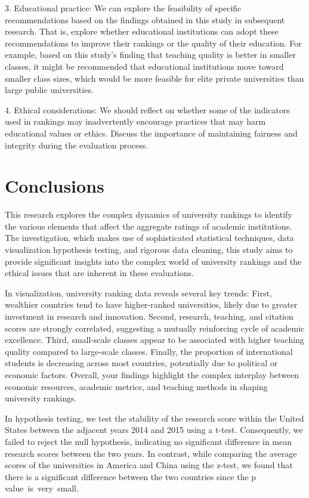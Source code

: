 \documentclass[a4paper]{article}
\begin{document}
3. Educational practice: We can explore the feasibility of specific recommendations based on the findings obtained in this study in subsequent research. That is, explore whether educational institutions can adopt these recommendations to improve their rankings or the quality of their education. For example, based on this study's finding that teaching quality is better in smaller classes, it might be recommended that educational institutions move toward smaller class sizes, which would be more feasible for elite private universities than large public universities.

4. Ethical considerations: We should reflect on whether some of the indicators used in rankings may inadvertently encourage practices that may harm educational values or ethics. Discuss the importance of maintaining fairness and integrity during the evaluation process.

\section*{Conclusions}
This research explores the complex dynamics of university rankings to identify the various elements that affect the aggregate ratings of academic institutions. The investigation, which makes use of sophisticated statistical techniques, data visualization hypothesis testing, and rigorous data cleaning, this study aims to provide significant insights into the complex world of university rankings and the ethical issues that are inherent in these evaluations.

In visualization, university ranking data reveals several key trends: First, wealthier countries tend to have higher-ranked universities, likely due to greater investment in research and innovation. Second, research, teaching, and citation scores are strongly correlated, suggesting a mutually reinforcing cycle of academic excellence. Third, small-scale classes appear to be associated with higher teaching quality compared to large-scale classes. Finally, the proportion of international students is decreasing across most countries, potentially due to political or economic factors. Overall, your findings highlight the complex interplay between economic resources, academic metrics, and teaching methods in shaping university rankings.

In hypothesis testing, we test the stability of the research score within the United States between the adjacent years 2014 and 2015 using a t-test. Consequently, we failed to reject the null hypothesis, indicating no significant difference in mean research scores between the two years. In contrast, while comparing the average scores of the universities in America and China using the z-test, we found that there is a significant difference between the two countries since the p value is very small.

\clearpage



\end{document}

